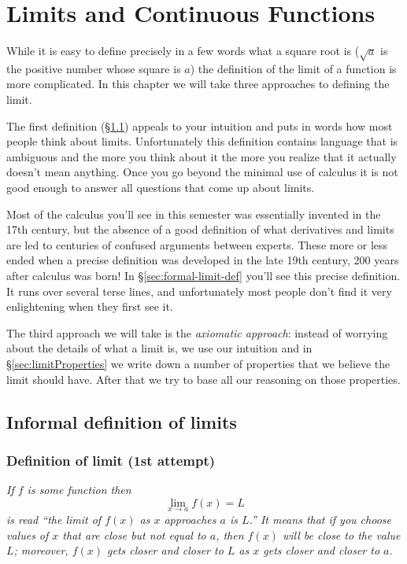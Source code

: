 \chapter{Limits and Continuous Functions}
While it is easy to define precisely in a few words what a square root
is ($\sqrt{a}$ is the positive number whose square is $a$) the
definition of the limit of a function is more complicated.  In this
chapter we will take three approaches to defining the limit. 

The first definition (\S\ref{sec:informal-limit-def}) appeals to your
intuition and puts in words how most people think about limits.
Unfortunately this definition contains language that is ambiguous and
the more you think about it the more you realize that it actually
doesn't mean anything.  Once you go beyond the minimal use of calculus
it is not good enough to answer all questions that come up about
limits.  

Most of the calculus you'll see in this semester was essentially invented
in the 17th century, but the absence of a good definition of what
derivatives and limits are led to centuries of confused arguments between
experts.  These more or less ended when a precise definition was developed
in the late 19th century, 200 years after calculus was born!  In
\S\ref{sec:formal-limit-def} you'll see this precise definition.  It runs
over several terse lines, and unfortunately most people don't find it very
enlightening when they first see it.

The third approach we will take is the \emph{axiomatic approach}:
instead of worrying about the details of what a limit is, we use our
intuition and in \S\ref{sec:limitProperties} we write down a number of
properties that we believe the limit should have.  After that we try
to base all our reasoning on those properties.

\section{Informal definition of limits}
\label{sec:informal-limit-def}

\subsection{Definition of limit (1st attempt)}
\itshape\label{def:limit-first-attempt}
If $f$ is some function then
\[
\lim_{x\to a} f(x) = L
\]
is read ``the limit of $f(x)$ as $x$ approaches $a$ is $L$.''  It
means that if you choose values of $x$ that are close \emph{but not
  equal} to $a$, then $f(x)$ will be close to the value $L$; moreover,
$f(x)$ gets closer and closer to $L$ as $x$ gets closer and closer to
$a$.  \upshape\smallskip

